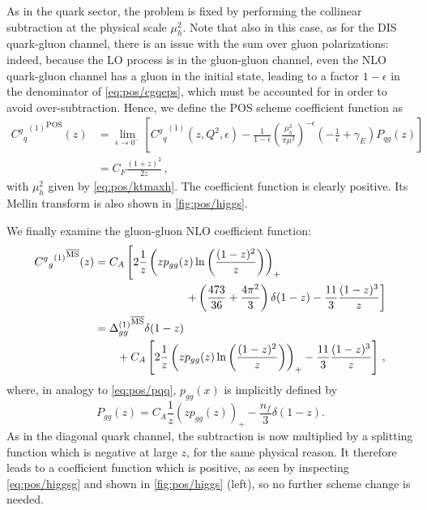 As in the quark sector, the problem is fixed by performing the
collinear subtraction at the physical scale $\mu_h^2$. Note that
also in this case, as for the DIS quark-gluon channel,
there is an issue with the sum over gluon polarizations: indeed,
because the LO process is in the gluon-gluon channel, even the NLO
quark-gluon channel has a gluon in the initial state, leading
to a factor  $1-\epsilon$ in the 
denominator of \cref{eq:pos/cgqeps}, which must be accounted for in
order to avoid over-subtraction.
Hence, we define the POS scheme coefficient function as
\begin{align}\label{eq:pos/cqrenposh}
  {{C^g{}_q}^{(1)}}^{\textrm{POS}} (z)  &= \lim_{\epsilon\to0^-}
  \left[  {C^g{}_q}^{(1)}(z,Q^2,\epsilon) - \frac{1}{1-\epsilon}\left(\frac{\mu_h^2}{\pi\mu^2}\right)^{-\epsilon} \left(-\frac 1
    {\epsilon}+\gamma_E\right) P_{qg}(z)\right]\\ \label{eq:pos/cqrenposh1}
    &=C_F \frac{(1+z)^2}{2z} \, ,
\end{align}
with $\mu_h^2$ given by \cref{eq:pos/ktmaxh}.
The coefficient function is clearly positive. Its Mellin transform is
also shown in \cref{fig:pos/higgs}.

We finally examine the gluon-gluon NLO coefficient function:
\begin{align}
  \label{eq:pos/higgsg}
  {{C^g{}_g}^{(1)}}^{{\overline{\textrm{MS}}}} (z) 
  &=C_A\left[ 2\frac 1 z \left(z p_{gg}(z) \ln\left(\frac{(1-z)^2}{z}\right) \right)_+
    \right. \nonumber\\
    &\qquad\qquad\qquad\qquad \left.
      + \left(\frac{473}{36} + \frac{4\pi^2}{3}\right)\delta(1-z) -
      \frac{11}{3}\frac{(1-z)^3}{z} \right]\\
    &={\Delta^{(1)}_{gg}}^{{\overline{\textrm{MS}}}}\delta(1-z)
      \nonumber\\
      &\qquad
      + C_A \left[ 2\frac 1 z \left(z p_{gg}(z) \ln\left(\frac{(1-z)^2}{z}\right) \right)_+-
      \frac{11}{3}\frac{(1-z)^3}{z}\right] \,,
\end{align}
where, in analogy to \cref{eq:pos/pqq}, $p_{gg}(x)$ is implicitly
defined by
\begin{equation}\label{eq:pos/pgg}
  P_{gg}(z)= C_A\frac 1 z \left(z p_{gg}(z)\right)_+ - \frac{n_f}{3} \delta(1-z).
\end{equation}
As in the diagonal quark channel, the \msbar{} subtraction is now
multiplied by a splitting function which is negative at large $z$, for
the same physical reason. It therefore leads to a coefficient function
which is positive, as seen by inspecting \cref{eq:pos/higgsg} and
shown in \cref{fig:pos/higgs} (left), so no further scheme change is needed.

